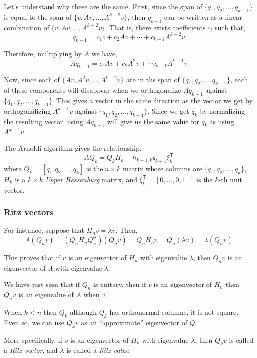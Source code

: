 \documentclass[10pt]{article}
\begin{document}
Let's understand why these are the same.
First, since the span of \(\{q_1,q_2,\ldots, q_{k-1}\}\) is equal to the span of \(\{v,Av,\ldots, A^{k-2}v\}\), then \(q_{k-1}\) can be written as a linear combination of \(\{v,Av,\ldots, A^{k-2}v\}\).
That is, there exists coefficients \(c_i\) such that,
\[
q_{k-1} = c_1v + c_2Av + \cdots + c_{k-1} A^{k-2}v
\]

Therefore, multiplying by \(A\) we have,
\[
Aq_{k-1} = c_1Av + c_2A^2v + \cdots c_{k-1}A^{k-1}v
\]

Now, since each of \(\{Av,A^2v,\ldots, A^{k-2}v\}\) are in the span of \(\{q_1,q_2,\ldots, q_{k-1}\}\), each of these components will disappear when we orthogonalize \(Aq_{k-1}\) against \(\{q_1,q_2,\ldots,q_{k-1}\}\).
This gives a vector in the same direction as the vector we get by orthogonalizing \(A^{k-1}v\) against \(\{q_1,q_2,\ldots,q_{k-1}\}\).
Since we get \(q_k\) by normalizing the resulting vector, using \(Aq_{k-1}\) will give us the same value for \(q_k\) as using \(A^{k-1}v\).

The Arnoldi algorithm gives the relationship,
\[
AQ_k = Q_k H_k + h_{k+1,k} q_{k+1} \xi_k^{\mathsf{T}}
\]
where \(Q_k = [q_1,q_2,\ldots,q_k]\) is the \(n\times k\) matrix whose columns are \(\{q_1,q_2,\ldots,q_k\}\), \(H_k\) is a \(k\times k\) \href{https://en.wikipedia.org/wiki/Hessenberg_matrix}{\emph{Upper Hessenburg}} matrix, and \(\xi_k^{\mathsf{T}} = [0,\ldots,0,1]^{\mathsf{T}}\) is the \(k\)-th unit vector.

\subsubsection{Ritz vectors}

For instance, suppose that \(H_nv = \lambda v\). Then,
\[
A(Q_nv) = (Q_nH_nQ_n^{\mathsf{H}})(Q_nv) = Q_nH_nv = Q_n(\lambda v) = \lambda (Q_nv)
\]

This proves that if \(v\) is an eigenvector of \(H_n\) with eigenvalue \(\lambda\), then \(Q_nv\) is an eigenvector of \(A\) with eigenvalue \(\lambda\).

We have just seen that if \(Q_n\) is unitary, then if \(v\) is an eigenvector of \(H_n\) then \(Q_nv\) is an eigenvalue of \(A\) when \(v\).

When \(k<n\) then \(Q_k\) although \(Q_k\) has orthonormal columns, it is not square. Even so, we can use \(Q_kv\) as an ``approximate'' eigenvector of \(Q\).

More specifically, if \(v\) is an eigenvector of \(H_k\) with eigenvalue \(\lambda\), then \(Q_kv\) is called a \emph{Ritz vector}, and \(\lambda\) is called a \emph{Ritz value}.
\end{document}
